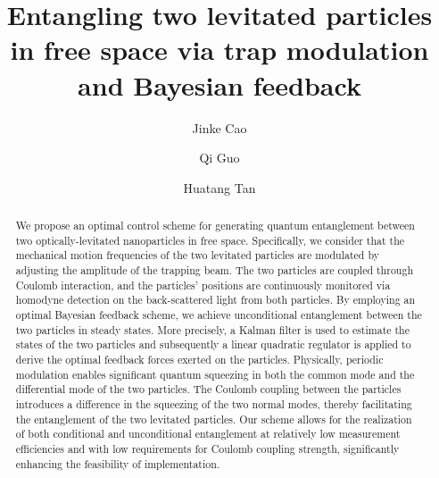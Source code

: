 \documentclass[
aps,
reprint,
superscriptaddress,
amsmath,amssymb,
pra
]{revtex4-2}
\begin{document}
\title{Entangling two levitated particles in free space via trap modulation and Bayesian feedback}

\author{Jinke Cao}

\author{Qi Guo}

\author{Huatang Tan}


\begin{abstract}
We propose an optimal control scheme for generating quantum entanglement between two optically-levitated nanoparticles in free space. Specifically, we consider that the mechanical motion frequencies of the two levitated particles are modulated by adjusting the amplitude of the trapping beam. The two particles are coupled through Coulomb interaction, and the particles' positions are continuously monitored via homodyne detection on the back-scattered light from both particles. By employing an optimal Bayesian feedback scheme, we achieve unconditional entanglement between the two particles in steady states. More precisely, a Kalman filter is used to estimate the states of the two particles and subsequently a linear quadratic regulator is applied to derive the optimal feedback forces exerted on the particles. Physically, periodic modulation enables significant quantum squeezing in both the common mode and the differential mode of the two particles. The Coulomb coupling between the particles introduces a difference in the squeezing of the two normal modes, thereby facilitating the entanglement of the two levitated particles. Our scheme allows for the realization of both conditional and unconditional entanglement at relatively low measurement efficiencies and with low requirements for Coulomb coupling strength, significantly enhancing the feasibility of implementation.
\end{abstract}

\maketitle
\end{document}
